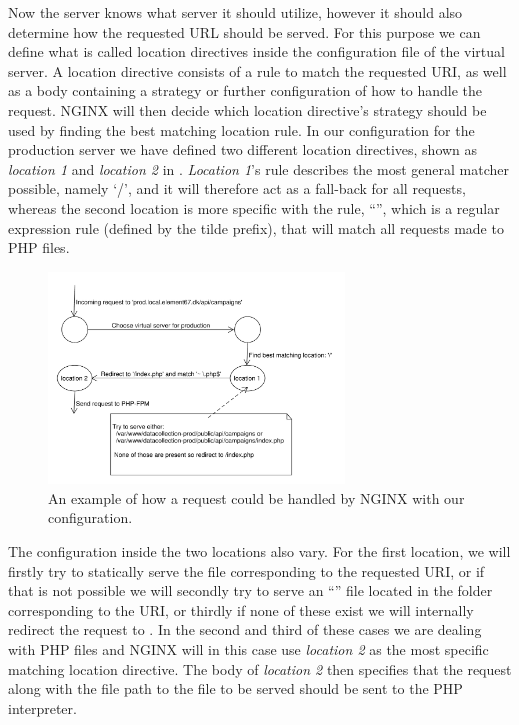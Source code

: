 Now the server knows what server it should utilize, however it should also determine how the requested URL should be served. For this purpose we can define what is called location directives inside the configuration file of the virtual server. A location directive consists of a rule to match the requested URI, as well as a body containing a strategy or further configuration of how to handle the request. NGINX will then decide which location directive's strategy should be used by finding the best matching location rule. In our configuration for the production server we have defined two different location directives, shown as \emph{location 1} and \emph{location 2} in . \emph{Location 1}'s rule describes the most general matcher possible, namely `/', and it will therefore act as a fall-back for all requests, whereas the second location is more specific with the rule, ``'', which is a regular expression rule (defined by the tilde prefix), that will match all requests made to PHP files. 
\\
\begin{figure}[!htbp]
    \centering
    \includegraphics[width=0.7\textwidth]{graphic/architecture/NGINX_workflow.pdf}
    \caption{An example of how a request could be handled by NGINX with our configuration.}
    \label{fig:NGINX_workflow}
\end{figure}
\FloatBarrier

The configuration inside the two locations also vary. For the first location, we will firstly try to statically serve the file corresponding to the requested URI, or if that is not possible we will secondly try to serve an ``'' file located in the folder corresponding to the URI, or thirdly if none of these exist we will internally redirect the request to . In the second and third of these cases we are dealing with PHP files and NGINX will in this case use \emph{location 2} as the most specific matching location directive. The body of \emph{location 2} then specifies that the request along with the file path to the file to be served should be sent to the PHP interpreter. 


